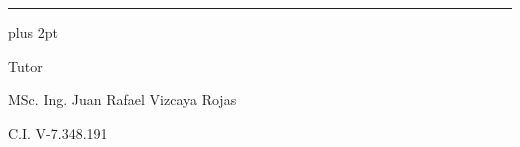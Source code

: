 \begin{titlepage}
    \vfill
    
    \begin{center}
        
        \rule{6cm}{1pt}
        
        \vspace{0.2cm}
        
        \parskip=0pt plus 2pt
        
        \begin{spacing}{1}
            Tutor
        
            MSc. Ing. Juan Rafael Vizcaya Rojas
        
            C.I. V-7.348.191
        \end{spacing}
        
    \end{center}
    
    \vspace{0.5cm}
    
    \end{titlepage}
